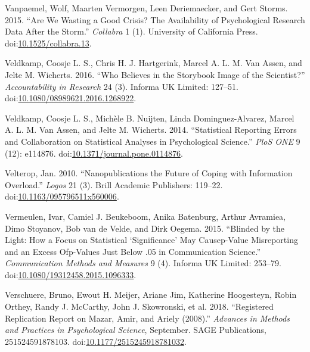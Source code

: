 \documentclass[a5paper]{book}
\begin{document}
\hypertarget{ref-doi:10.1525ux2fcollabra.13}{}
Vanpaemel, Wolf, Maarten Vermorgen, Leen Deriemaecker, and Gert Storms.
2015. ``Are We Wasting a Good Crisis? The Availability of Psychological
Research Data After the Storm.'' \emph{Collabra} 1 (1). University of
California Press.
doi:\href{https://doi.org/10.1525/collabra.13}{10.1525/collabra.13}.

\hypertarget{ref-doi:10.1080ux2f08989621.2016.1268922}{}
Veldkamp, Coosje L. S., Chris H. J. Hartgerink, Marcel A. L. M. Van
Assen, and Jelte M. Wicherts. 2016. ``Who Believes in the Storybook
Image of the Scientist?'' \emph{Accountability in Research} 24 (3).
Informa UK Limited: 127--51.
doi:\href{https://doi.org/10.1080/08989621.2016.1268922}{10.1080/08989621.2016.1268922}.

\hypertarget{ref-doi:10.1371ux2fjournal.pone.0114876}{}
Veldkamp, Coosje L. S., Michèle B. Nuijten, Linda Dominguez-Alvarez,
Marcel A. L. M. Van Assen, and Jelte M. Wicherts. 2014. ``Statistical
Reporting Errors and Collaboration on Statistical Analyses in
Psychological Science.'' \emph{PloS ONE} 9 (12): e114876.
doi:\href{https://doi.org/10.1371/journal.pone.0114876}{10.1371/journal.pone.0114876}.

\hypertarget{ref-doi:10.1163ux2f095796511X560006}{}
Velterop, Jan. 2010. ``Nanopublications the Future of Coping with
Information Overload.'' \emph{Logos} 21 (3). Brill Academic Publishers:
119--22.
doi:\href{https://doi.org/10.1163/095796511x560006}{10.1163/095796511x560006}.

\hypertarget{ref-doi:10.1080ux2f19312458.2015.1096333}{}
Vermeulen, Ivar, Camiel J. Beukeboom, Anika Batenburg, Arthur Avramiea,
Dimo Stoyanov, Bob van de Velde, and Dirk Oegema. 2015. ``Blinded by the
Light: How a Focus on Statistical `Significance' May Causep-Value
Misreporting and an Excess Ofp-Values Just Below .05 in Communication
Science.'' \emph{Communication Methods and Measures} 9 (4). Informa UK
Limited: 253--79.
doi:\href{https://doi.org/10.1080/19312458.2015.1096333}{10.1080/19312458.2015.1096333}.

\hypertarget{ref-doi:10.1177ux2f2515245918781032}{}
Verschuere, Bruno, Ewout H. Meijer, Ariane Jim, Katherine Hoogesteyn,
Robin Orthey, Randy J. McCarthy, John J. Skowronski, et al. 2018.
``Registered Replication Report on Mazar, Amir, and Ariely (2008).''
\emph{Advances in Methods and Practices in Psychological Science},
September. SAGE Publications, 251524591878103.
doi:\href{https://doi.org/10.1177/2515245918781032}{10.1177/2515245918781032}.
\end{document}
